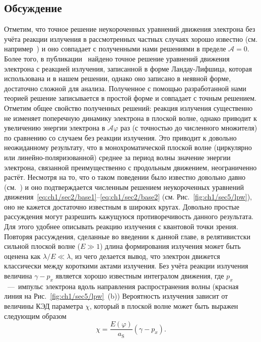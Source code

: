 \subsection{Обсуждение}
Отметим, что точное решение неукороченных уравнений движения электрона без учёта реакции излучения в рассмотренных частных случаях хорошо известно (см. например~\cite{LandauII}) и оно совпадает с полученными нами решениями в пределе $\mathcal{A}=0$.
Более того, в публикации~\cite{di2008exact} найдено точное решение уравнений движения электрона с реакцией излучения, записанной в форме Ландау-Лифшица, которая использована и в нашем решении, однако оно записано в неявной форме, достаточно сложной для анализа.
Полученное с помощью разработанной нами теорией решение записывается в простой форме и совпадает с точным решением.
Отметим общее свойство полученных решений: реакция излучения существенно не изменяет поперечную динамику электрона в плоской волне, однако приводит к увеличению энергии электрона в $\mathcal{A}\varphi$ раз (с точностью до численного множителя) по сравнению со случаем без реакции излучения.
Это приводит к довольно неожиданному результату, что в монохроматической плоской волне (циркулярно или линейно-поляризованной) среднее за период волны значение энергии электрона, связанной преимущественно с продольным движением,  неограниченно растёт.
Несмотря на то, что о таком поведении было известно довольно давно (см.~\cite{Zeldovich75, di2008exact,gunn1971motion, grewing1973acceleration, thielheim1993particle,ekman2021exact}) и оно подтверждается численным решением неукороченных уравнений движения~\eqref{eq:ch1/sec2/base1}--\eqref{eq:ch1/sec2/base2} (см. Рис.~\ref{fig:ch1/sec5/lpw}), оно не кажется достаточно известным в широких кругах.
Довольно простые рассуждения могут разрешить кажущуюся противоречивость данного результата.
Для этого удобнее описывать реакцию излучения с квантовой точки зрения.
Повторяя рассуждения, сделанные во введении к данной главе, в релятивистски сильной плоской волне ($E \gg 1$) длина формирования излучения может быть оценена как $\lambda/E \ll \lambda$, из чего делается вывод, что электрон движется классически между короткими актами излучения.
Без учёта реакции излучения величина $\gamma - p_x$ является хорошо известным интегралом движения, где $p_x$~---~импульс электрона вдоль направления распространения волны (красная линия на Рис.~\ref{fig:ch1/sec5/lpw}~(b)) 
Вероятность излучения зависит от величины КЭД параметра $\chi$, который в плоской волне может быть выражен следующим образом
\begin{equation}
    \chi = \frac{E(\varphi)}{a_\mathrm{S}} \left( \gamma - p_x \right) .
\end{equation}
